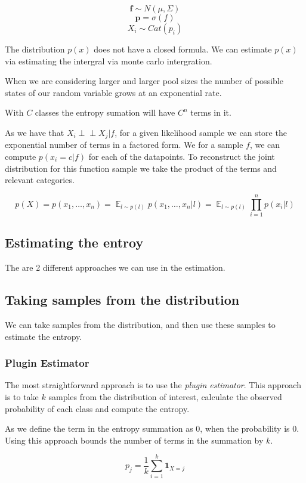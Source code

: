 \documentclass[12pt, a4paper]{report}
\theoremstyle{definition}
\DeclareMathOperator{\E}{\mathbb{E}}
\begin{document}
$$ \mathbf{f} \sim N(\mu, \Sigma) $$
$$ \mathbf{p} =  \sigma \left(f \right) $$
$$ X_i \sim Cat(p_i) $$

The distribution $p(x)$ does not have a closed formula. We can estimate $p(x)$ via estimating the intergral via monte carlo intergration.

When we are considering larger and larger pool sizes the number of possible states of our random variable grows at an exponential rate.

With $C$ classes the entropy sumation will have $C^n$ terms in it. 

As we have that $ X_i \perp\!\!\!\perp X_j | f$, for a given likelihood sample we can store the exponential number of terms in a factored form. We for a sample $f$, we can compute $p(x_i = c | f)$ for each of the datapoints. To reconstruct the joint distribution for this function sample we take the product of the terms and relevant categories.


$$ p(X) = p(x_1, \ldots, x_n) = \E_{l \sim p(l)}  p(x_1, \ldots, x_n | l) = \E_{l \sim p(l)} \prod_{i=1}^n  p(x_i| l)$$

\subsection{Estimating the entroy}

The are 2 different approaches we can use in the estimation.

\subsection{Taking samples from the distribution}

We can take samples from the distribution, and then use these samples to estimate the entropy.



\subsubsection{Plugin Estimator}
The most straightforward approach is to use the \textit{plugin estimator}. This approach is to take $k$ samples from the distribution of interest, calculate the observed probability of each class and compute the entropy.

As we define the term in the entropy summation as $0$, when the probability is $0$. Using this approach bounds the number of terms in the summation by $k$.

$$p_j = \frac{1}{k} \sum_{i=1}^k \mathbf{1}_{X = j} $$
\end{document}
